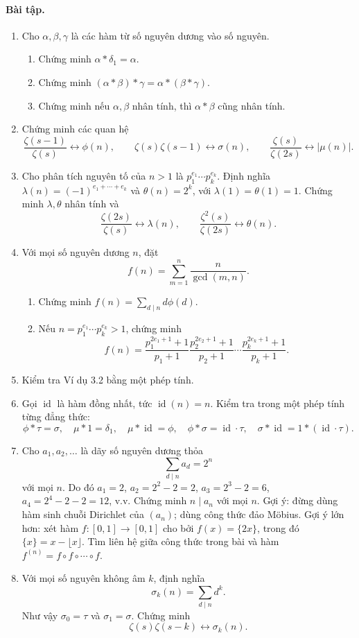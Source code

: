 \documentclass[11pt]{article}
\begin{document}
\paragraph{Bài tập.}
\begin{enumerate}
\item Cho \(\alpha,\beta,\gamma\) là các hàm từ số nguyên dương vào số nguyên.
\begin{enumerate}[label=(\alph*)]
\item Chứng minh \(\alpha*\delta_1=\alpha\).
\item Chứng minh \((\alpha*\beta)*\gamma=\alpha*(\beta*\gamma)\).
\item Chứng minh nếu \(\alpha,\beta\) nhân tính, thì \(\alpha*\beta\) cũng
nhân tính.
\end{enumerate}
\item Chứng minh các quan hệ
\[
 \frac{\zeta(s-1)}{\zeta(s)}\leftrightarrow\phi(n),\qquad
 \zeta(s)\zeta(s-1)\leftrightarrow\sigma(n),\qquad
 \frac{\zeta(s)}{\zeta(2s)}\leftrightarrow|\mu(n)|.
\]
\item Cho phân tích nguyên tố của \(n>1\) là \(p_1^{e_1}\cdots p_k^{e_k}\).
Định nghĩa \(\lambda(n)=(-1)^{e_1+\cdots+e_k}\) và \(\theta(n)=2^k\), với
\(\lambda(1)=\theta(1)=1\). Chứng minh \(\lambda,\theta\) nhân tính và
\[
 \frac{\zeta(2s)}{\zeta(s)}\leftrightarrow\lambda(n),\qquad
 \frac{\zeta^2(s)}{\zeta(2s)}\leftrightarrow\theta(n).
\]
\item Với mọi số nguyên dương \(n\), đặt
\[
 f(n)=\sum_{m=1}^n\frac n{\gcd(m,n)}.
\]
\begin{enumerate}[label=(\alph*)]
\item Chứng minh \(f(n)=\sum_{d\mid n}d\phi(d)\).
\item Nếu \(n=p_1^{e_1}\cdots p_k^{e_k}>1\), chứng minh
\[
 f(n)=\frac{p_1^{2e_1+1}+1}{p_1+1}
 \frac{p_2^{2e_2+1}+1}{p_2+1}\cdots
 \frac{p_k^{2e_k+1}+1}{p_k+1}.
\]
\end{enumerate}
\item Kiểm tra Ví dụ 3.2 bằng một phép tính.
\item Gọi \(\operatorname{id}\) là hàm đồng nhất, tức \(\operatorname{id}(n)=n\).
Kiểm tra trong một phép tính từng đẳng thức:
\[
 \phi*\tau=\sigma,\quad
 \mu*1=\delta_1,\quad
 \mu*\operatorname{id}=\phi,\quad
 \phi*\sigma=\operatorname{id}\cdot\tau,\quad
 \sigma*\operatorname{id}=1*(\operatorname{id}\cdot\tau).
\]
\item Cho \(a_1,a_2,\ldots\) là dãy số nguyên dương thỏa
\[
 \sum_{d\mid n}a_d=2^n
\]
với mọi \(n\). Do đó \(a_1=2\), \(a_2=2^2-2=2\),
\(a_3=2^3-2=6\), \(a_4=2^4-2-2=12\), v.v. Chứng minh \(n\mid a_n\) với mọi
\(n\). Gợi ý: đừng dùng hàm sinh chuỗi Dirichlet của \((a_n)\); dùng công thức
đảo Möbius. Gợi ý lớn hơn: xét hàm \(f:[0,1]\to[0,1]\) cho bởi \(f(x)=\{2x\}\),
trong đó \(\{x\}=x-\lfloor x\rfloor\). Tìm liên hệ giữa công thức trong bài và
hàm \(f^{(n)}=f\circ f\circ\cdots\circ f\).
\item Với mọi số nguyên không âm \(k\), định nghĩa
\[
 \sigma_k(n)=\sum_{d\mid n}d^k.
\]
Như vậy \(\sigma_0=\tau\) và \(\sigma_1=\sigma\). Chứng minh
\[
 \zeta(s)\zeta(s-k)\leftrightarrow\sigma_k(n).
\]
\end{enumerate}
\end{document}
